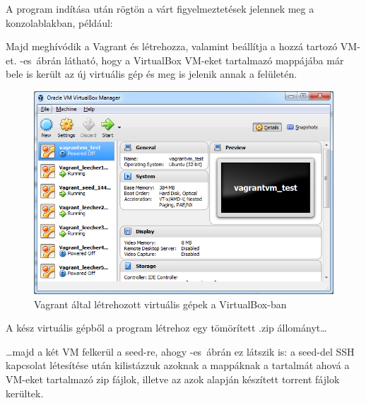 A program indítása után rögtön a várt figyelmeztetések jelennek meg a konzolablakban, például:


Majd meghívódik a Vagrant és létrehozza, valamint beállítja a hozzá tartozó VM-et. -es~ábrán látható, hogy a VirtualBox VM-eket tartalmazó mappájába már bele is került az új virtuális gép és meg is jelenik annak a felületén.

\begin{figure}[ht]
\centering
\includegraphics[width=140mm, keepaspectratio]{figures/test_vbox.png}
\caption{Vagrant által létrehozott virtuális gépek a VirtualBox-ban}
\label{fig:vboxcap}
\end{figure}
A kész virtuális gépből a program létrehoz egy tömörített .zip állományt\ldots


\ldots majd a két VM felkerül a seed-re, ahogy -es~ábrán ez látszik is:  a seed-del SSH kapcsolat létesítése után kilistázzuk azoknak a mappáknak a tartalmát ahová a VM-eket tartalmazó zip fájlok, illetve az azok alapján készített torrent fájlok kerültek.

